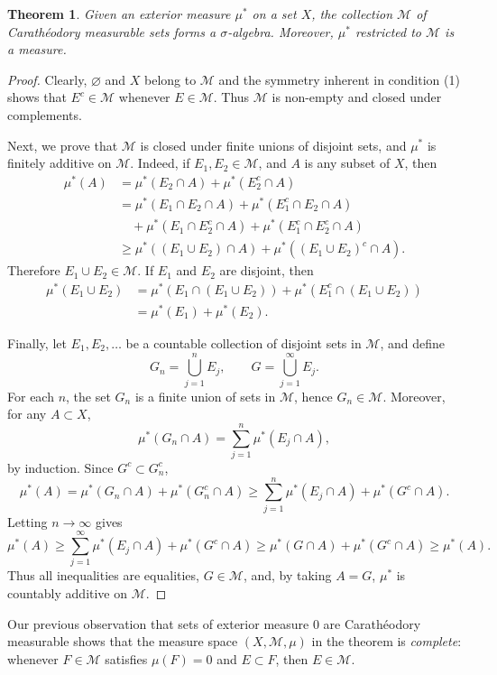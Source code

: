 \documentclass[11pt,openany]{book}
\newtheorem{theorem}{Theorem}[section]
\begin{document}
\begin{theorem}
Given an exterior measure $\mu^*$ on a set $X$, the collection $\mathcal M$ of Carath\'eodory measurable sets forms a $\sigma$-algebra. Moreover, $\mu^*$ restricted to $\mathcal M$ is a measure.
\end{theorem}

\begin{proof}
Clearly, $\varnothing$ and $X$ belong to $\mathcal M$ and the symmetry inherent in condition (1) shows that $E^c\in\mathcal M$ whenever $E\in\mathcal M$. Thus $\mathcal M$ is non-empty and closed under complements.

Next, we prove that $\mathcal M$ is closed under finite unions of disjoint sets, and $\mu^*$ is finitely additive on $\mathcal M$. Indeed, if $E_1,E_2\in\mathcal M$, and $A$ is any subset of $X$, then
\begin{align*}
\mu^*(A)
&=\mu^*(E_2\cap A)+\mu^*(E_2^c\cap A)\\
&=\mu^*(E_1\cap E_2\cap A)+\mu^*(E_1^c\cap E_2\cap A)\\
&\quad+\mu^*(E_1\cap E_2^c\cap A)+\mu^*(E_1^c\cap E_2^c\cap A)\\
&\geq \mu^*((E_1\cup E_2)\cap A)+\mu^*((E_1\cup E_2)^c\cap A).
\end{align*}
Therefore $E_1\cup E_2\in\mathcal M$. If $E_1$ and $E_2$ are disjoint, then
\begin{align*}
\mu^*(E_1\cup E_2)
&=\mu^*(E_1\cap(E_1\cup E_2))+\mu^*(E_1^c\cap(E_1\cup E_2))\\
&=\mu^*(E_1)+\mu^*(E_2).
\end{align*}

Finally, let $E_1,E_2,\ldots$ be a countable collection of disjoint sets in $\mathcal M$, and define
\[
G_n=\bigcup_{j=1}^nE_j,
\qquad
G=\bigcup_{j=1}^{\infty}E_j.
\]
For each $n$, the set $G_n$ is a finite union of sets in $\mathcal M$, hence $G_n\in\mathcal M$. Moreover, for any $A\subset X$,
\[
\mu^*(G_n\cap A)=\sum_{j=1}^n\mu^*(E_j\cap A),
\]
by induction. Since $G^c\subset G_n^c$,
\[
\mu^*(A)=\mu^*(G_n\cap A)+\mu^*(G_n^c\cap A)
\geq \sum_{j=1}^n\mu^*(E_j\cap A)+\mu^*(G^c\cap A).
\]
Letting $n\to\infty$ gives
\[
\mu^*(A)\geq\sum_{j=1}^{\infty}\mu^*(E_j\cap A)+\mu^*(G^c\cap A)
\geq \mu^*(G\cap A)+\mu^*(G^c\cap A)
\geq \mu^*(A).
\]
Thus all inequalities are equalities, $G\in\mathcal M$, and, by taking $A=G$, $\mu^*$ is countably additive on $\mathcal M$.
\end{proof}

Our previous observation that sets of exterior measure $0$ are Carath\'eodory measurable shows that the measure space $(X,\mathcal M,\mu)$ in the theorem is \emph{complete}: whenever $F\in\mathcal M$ satisfies $\mu(F)=0$ and $E\subset F$, then $E\in\mathcal M$.
\end{document}
